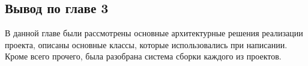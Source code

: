\documentclass[14pt,a4paper]{scrartcl}
\begin{document}
    
    
    

    \subsection{Вывод по главе 3}\label{subsec:3-conclusion}\indent

    В данной главе были рассмотрены основные архитектурные решения реализации проекта, описаны основные классы, которые использовались при написании.
    Кроме всего прочего, была разобрана система сборки каждого из проектов.

    

    

    
    
\end{document}
